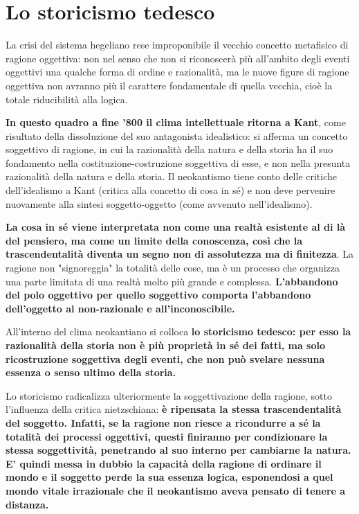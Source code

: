 \chapter{Lo storicismo tedesco}

La crisi del sistema hegeliano rese improponibile il vecchio concetto metafisico di ragione oggettiva: non nel senso che non si riconoscerà più all'ambito degli eventi oggettivi una qualche forma di ordine e razionalità, ma le nuove figure di ragione oggettiva non avranno più il carattere fondamentale di quella vecchia, cioè la totale riducibilità alla logica.

\textbf{In questo quadro a fine '800 il clima intellettuale ritorna a Kant}, come risultato della dissoluzione del suo antagonista idealistico: si afferma un concetto soggettivo di ragione, in cui la razionalità della natura e della storia ha il suo fondamento nella costituzione-costruzione soggettiva di esse, e non nella presunta razionalità della natura e della storia.
Il neokantismo tiene conto delle critiche dell'idealismo a Kant (critica alla concetto di cosa in sé) e non deve pervenire nuovamente alla sintesi soggetto-oggetto (come avvenuto nell'idealismo).

\textbf{La cosa in sé viene interpretata non come una realtà esistente al di là del pensiero, ma come un limite della conoscenza, così che la trascendentalità diventa un segno non di assolutezza ma di finitezza}. La ragione non "signoreggia" la totalità delle cose, ma è un processo che organizza una parte limitata di una realtà molto più grande e complessa. \textbf{L'abbandono del polo oggettivo per quello soggettivo comporta l'abbandono dell'oggetto al non-razionale e all'inconoscibile.}

All'interno del clima neokantiano si colloca \textbf{lo storicismo tedesco: per esso la razionalità della storia non è più proprietà in sé dei fatti, ma solo ricostruzione soggettiva degli eventi, che non può svelare nessuna essenza  o senso ultimo della storia.}

Lo storicismo radicalizza ulteriormente la soggettivazione della ragione, sotto l'influenza della critica nietzschiana: \textbf{è ripensata la stessa trascendentalità del soggetto. Infatti, se la ragione non riesce a ricondurre a sé la totalità dei processi oggettivi, questi finiranno per condizionare la stessa soggettività, penetrando al suo interno per cambiarne la natura. E' quindi messa in dubbio la capacità della ragione di ordinare il mondo e il soggetto perde la sua essenza logica, esponendosi a quel mondo vitale irrazionale che il neokantismo aveva pensato di tenere a distanza.}